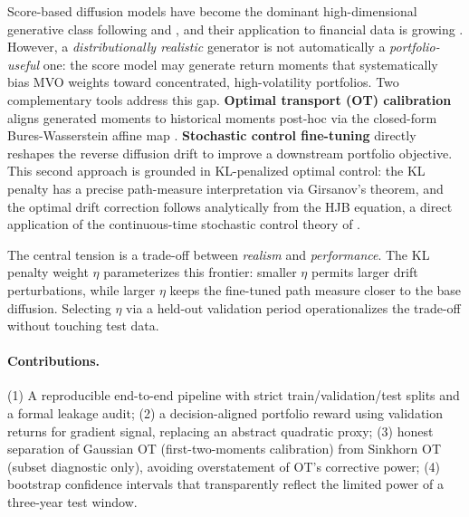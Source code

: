 \documentclass{article}
\begin{document}
Score-based diffusion models have become the dominant high-dimensional generative
class following \citet{ho2020denoising} and \citet{song2021score}, and their
application to financial data is growing \citep{takahashi2025generation,
aghapour2025solving}. However, a \emph{distributionally realistic} generator is
not automatically a \emph{portfolio-useful} one: the score model may generate
return moments that systematically bias MVO weights toward concentrated,
high-volatility portfolios. Two complementary tools address this gap.
\textbf{Optimal transport (OT) calibration} aligns generated moments to historical
moments post-hoc via the closed-form Bures-Wasserstein affine map
\citep{bures1969extension,brenier1991polar,bhatia2019bures}.
\textbf{Stochastic control fine-tuning} directly reshapes the reverse diffusion
drift to improve a downstream portfolio objective. This second approach is grounded
in KL-penalized optimal control: the KL penalty has a precise path-measure
interpretation via Girsanov's theorem, and the optimal drift correction follows
analytically from the HJB equation, a direct application of the continuous-time
stochastic control theory of \citet{han2024stochastic,fleming2006controlled,
oksendal2003stochastic}.

The central tension is a trade-off between \emph{realism} and \emph{performance}.
The KL penalty weight $\eta$ parameterizes this frontier: smaller $\eta$ permits
larger drift perturbations, while larger $\eta$ keeps the fine-tuned path measure
closer to the base diffusion. Selecting $\eta$ via a held-out validation period
operationalizes the trade-off without touching test data.

\paragraph{Contributions.}
(1) A reproducible end-to-end pipeline with strict train/validation/test splits and
a formal leakage audit; (2) a decision-aligned portfolio reward using validation
returns for gradient signal, replacing an abstract quadratic proxy; (3) honest
separation of Gaussian OT (first-two-moments calibration) from Sinkhorn OT (subset
diagnostic only), avoiding overstatement of OT's corrective power; (4) bootstrap
confidence intervals that transparently reflect the limited power of a three-year
test window.
\end{document}
